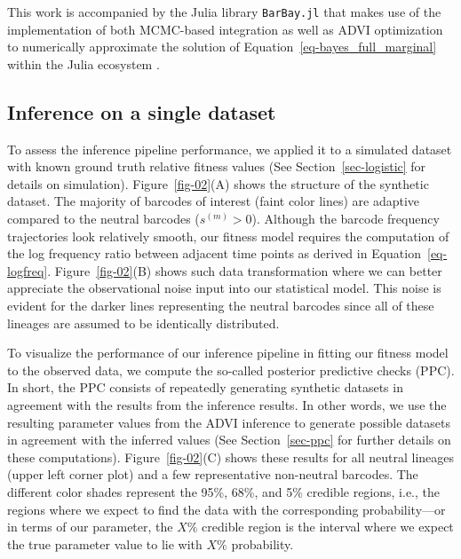 \documentclass[
  letterpaper,
  DIV=11,
  numbers=noendperiod]{scrartcl}
\begin{document}
\begin{refsegment}
This work is accompanied by the Julia library \texttt{BarBay.jl} that
makes use of the implementation of both MCMC-based integration as well
as ADVI optimization to numerically approximate the solution of
Equation~\ref{eq-bayes_full_marginal} within the Julia ecosystem
\autocite{ge2018}.

\hypertarget{inference-on-a-single-dataset}{%
\subsection{Inference on a single
dataset}\label{inference-on-a-single-dataset}}

To assess the inference pipeline performance, we applied it to a
simulated dataset with known ground truth relative fitness values (See
Section~\ref{sec-logistic} for details on simulation).
Figure~\ref{fig-02}(A) shows the structure of the synthetic dataset. The
majority of barcodes of interest (faint color lines) are adaptive
compared to the neutral barcodes (\(s^{(m)} > 0\)). Although the barcode
frequency trajectories look relatively smooth, our fitness model
requires the computation of the log frequency ratio between adjacent
time points as derived in Equation~\ref{eq-logfreq}.
Figure~\ref{fig-02}(B) shows such data transformation where we can
better appreciate the observational noise input into our statistical
model. This noise is evident for the darker lines representing the
neutral barcodes since all of these lineages are assumed to be
identically distributed.

To visualize the performance of our inference pipeline in fitting our
fitness model to the observed data, we compute the so-called posterior
predictive checks (PPC). In short, the PPC consists of repeatedly
generating synthetic datasets in agreement with the results from the
inference results. In other words, we use the resulting parameter values
from the ADVI inference to generate possible datasets in agreement with
the inferred values (See Section~\ref{sec-ppc} for further details on
these computations). Figure~\ref{fig-02}(C) shows these results for all
neutral lineages (upper left corner plot) and a few representative
non-neutral barcodes. The different color shades represent the 95\%,
68\%, and 5\% credible regions, i.e., the regions where we expect to
find the data with the corresponding probability---or in terms of our
parameter, the \(X\%\) credible region is the interval where we expect
the true parameter value to lie with \(X\%\) probability.


\end{refsegment}
\end{document}
